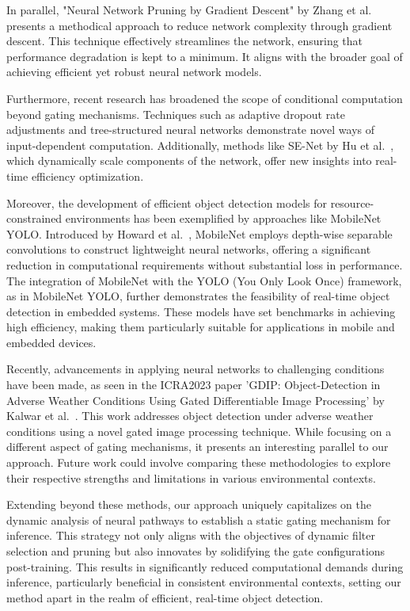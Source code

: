 \documentclass[runningheads]{llncs}
\begin{document}
In parallel, "Neural Network Pruning by Gradient Descent" by Zhang et al.~\cite{zhang2023neural} presents a methodical approach to reduce network complexity through gradient descent. This technique effectively streamlines the network, ensuring that performance degradation is kept to a minimum. It aligns with the broader goal of achieving efficient yet robust neural network models.

Furthermore, recent research has broadened the scope of conditional computation beyond gating mechanisms. Techniques such as adaptive dropout rate adjustments and tree-structured neural networks demonstrate novel ways of input-dependent computation. Additionally, methods like SE-Net by Hu et al.~\cite{hu2018squeeze}, which dynamically scale components of the network, offer new insights into real-time efficiency optimization.

Moreover, the development of efficient object detection models for resource-constrained environments has been exemplified by approaches like MobileNet YOLO. Introduced by Howard et al.~\cite{howard2019searching}, MobileNet employs depth-wise separable convolutions to construct lightweight neural networks, offering a significant reduction in computational requirements without substantial loss in performance. The integration of MobileNet with the YOLO (You Only Look Once) framework, as in MobileNet YOLO, further demonstrates the feasibility of real-time object detection in embedded systems. These models have set benchmarks in achieving high efficiency, making them particularly suitable for applications in mobile and embedded devices.

Recently, advancements in applying neural networks to challenging conditions have been made, as seen in the ICRA2023 paper 'GDIP: Object-Detection in Adverse Weather Conditions Using Gated Differentiable Image Processing' by Kalwar et al.~\cite{kalwar2023gdip}. This work addresses object detection under adverse weather conditions using a novel gated image processing technique. While focusing on a different aspect of gating mechanisms, it presents an interesting parallel to our approach. Future work could involve comparing these methodologies to explore their respective strengths and limitations in various environmental contexts.

Extending beyond these methods, our approach uniquely capitalizes on the dynamic analysis of neural pathways to establish a static gating mechanism for inference. This strategy not only aligns with the objectives of dynamic filter selection and pruning but also innovates by solidifying the gate configurations post-training. This results in significantly reduced computational demands during inference, particularly beneficial in consistent environmental contexts, setting our method apart in the realm of efficient, real-time object detection.
%
\end{document}
